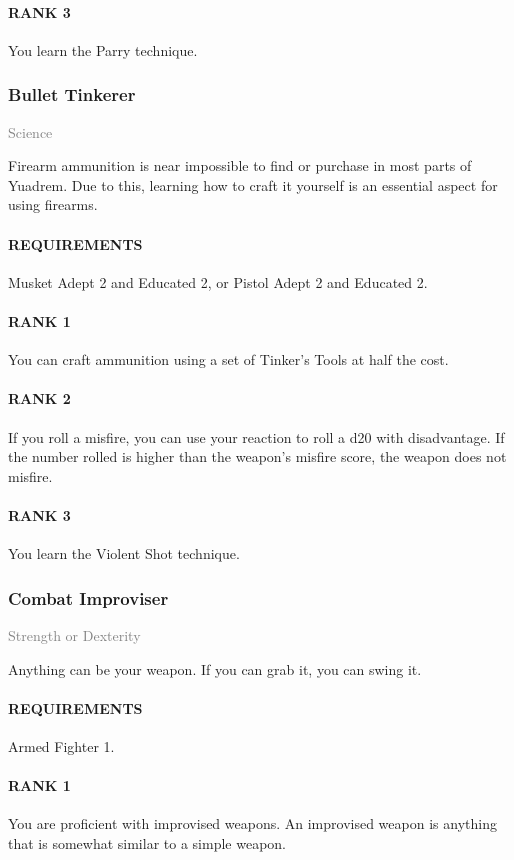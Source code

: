 \paragraph{RANK 3} You learn the Parry technique.

\subsubsection{Bullet Tinkerer} \label{feat::bullettinkerer}
\small{\textcolor{gray}{Science}}

\normalsize
Firearm ammunition is near impossible to find or purchase in most parts of Yuadrem.
Due to this, learning how to craft it yourself is an essential aspect for using firearms.
\paragraph{REQUIREMENTS} Musket Adept 2 and Educated 2, or Pistol Adept 2 and Educated 2.
\paragraph{RANK 1} You can craft ammunition using a set of Tinker's Tools at half the cost.
\paragraph{RANK 2} If you roll a misfire, you can use your reaction to roll a d20 with disadvantage.
If the number rolled is higher than the weapon's misfire score, the weapon does not misfire.
\paragraph{RANK 3} You learn the Violent Shot technique.
\subsubsection{Combat Improviser} \label{feat::combatimproviser}
\small{\textcolor{gray}{Strength or Dexterity}}

\normalsize
Anything can be your weapon.
If you can grab it, you can swing it.
\paragraph{REQUIREMENTS} Armed Fighter 1.
\paragraph{RANK 1} You are proficient with improvised weapons.
An improvised weapon is anything that is somewhat similar to a simple weapon.

